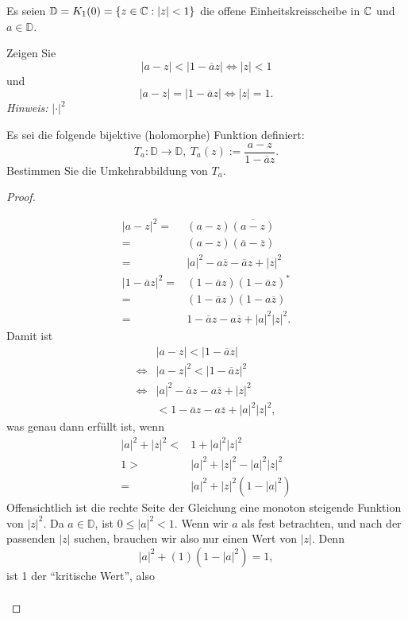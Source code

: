 \begin{Problem}
	Es seien $\mathbb{D}=K_1(0)=\{z\in \mathbb{C}:|z|<1\} $ die offene Einheitskreisscheibe in $\mathbb{C}$ und $a\in \mathbb{D}$.
	\begin{parts}
	\item Zeigen Sie
		\[
		|a-z|<|1-\overline{a}z| \iff |z| < 1
		\]
		und
		\[
		|a-z|=|1-\overline{a}z|\iff |z| = 1
		.\] 
		{\footnotesize\emph{Hinweis: }$|\cdot|^2$}
	\item Es sei die folgende bijektive (holomorphe) Funktion definiert:
		\[
		T_a:\mathbb{D}\to \mathbb{D},~T_a(z):=\frac{a-z}{1-\overline{a}z}
		.\] 
		Bestimmen Sie die Umkehrabbildung von $T_a$.
	\end{parts}
\end{Problem}
\begin{proof}
	\begin{parts}
	\item 
		\begin{align*}
			|a-z|^2=&(a-z)\overline{(a-z)}\\
			=&(a-z)(\overline{a}-\overline{z})\\
			=&|a|^2-a\overline{z}-\overline{a}z+|z|^2\\
			|1-\overline{a}z|^2=&(1-\overline{a}z)(1-\overline{a}z)^*\\
			=&(1-\overline{a}z)(1-a\overline{z})\\
			=&1-\overline{a}z-a\overline{z}+|a|^2|z|^2.
		\end{align*}
		Damit ist
		\begin{align*}
			&|a-z|<|1-\overline{a}z|\\
			\iff&|a-z|^2<|1-\overline{a}z|^2\\
			\iff&|a|^2-\overline{a}z-a\overline{z}+|z|^2\\
			&<1-\overline{a}z-a\overline{z}+|a|^2|z|^2,
		\end{align*}
		was genau dann erf\"{u}llt ist, wenn
		\begin{align*}
			|a|^2+|z|^2<&1+|a|^2|z|^2\\
			1>&|a|^2+|z|^2-|a|^2|z|^2\\
			=&|a|^2+|z|^2(1-|a|^2)
		\end{align*}
		Offensichtlich ist die rechte Seite der Gleichung eine monoton steigende Funktion von $|z|^2$. Da $a\in \mathbb{D}$, ist $0\le |a|^2<1$. Wenn wir $a$ als fest betrachten, und nach der passenden $|z|$ suchen, brauchen wir also nur einen Wert von $|z|$. Denn
		\[
		|a|^2+(1)(1-|a|^2)=1
		,\]
		ist 1 der ``kritische Wert'', also 
		\begin{align*}

\end{align*}
\end{parts}
\end{proof}
